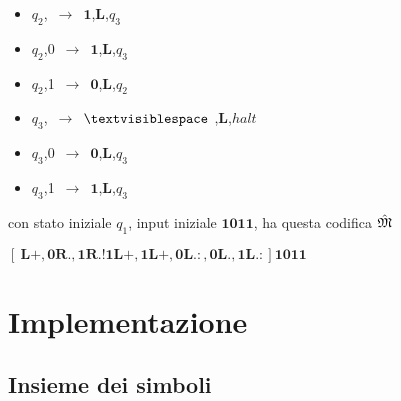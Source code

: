 \documentclass[a4paper]{article}
\theoremstyle{plain}
\theoremstyle{definition}
\begin{document}
	\vspace{1pt}
		\begin{itemize}
			\item  \begin{center}
			$q_2$,\textvisiblespace\ $\rightarrow$\ $\mathbf{1}$,$\mathbf{L}$,$q_3$
			\end{center}			
			\item \begin{center}
			$q_2$,0\ $\rightarrow$\ $\mathbf{1}$,$\mathbf{L}$,$q_3$
			\end{center}			
			\item \begin{center}
			$q_2$,1\ $\rightarrow$\ $\mathbf{0}$,$\mathbf{L}$,$q_2$
			\end{center}
		\end{itemize}	
	\vspace{3pt}

	\vspace{1pt}
		\begin{itemize}
			\item  \begin{center}
			$q_3$,\textvisiblespace\ $\rightarrow$\ $\mathbf{\textvisiblespace\ }$,$\mathbf{L}$,$halt$
			\end{center}			
			\item \begin{center}
			$q_3$,0\ $\rightarrow$\ $\mathbf{0}$,$\mathbf{L}$,$q_3$
			\end{center}			
			\item \begin{center}
			$q_3$,1\ $\rightarrow$\ $\mathbf{1}$,$\mathbf{L}$,$q_3$
			\end{center}
		\end{itemize}	
	\vspace{3pt}


con stato iniziale $q_1$, input iniziale $\mathbf{1011}$, ha questa codifica $\Hat{\mathfrak{M}}$

\vspace{3pt}
\begin{center}
$\mathbf{[\ L+,0R.,1R.!1L+,1L+,0L.:,0L.,1L.:]1011}$
\end{center}
\vspace{3pt}

\section{Implementazione}
\label{sec:Impl}


\subsection{Insieme dei simboli}
\label{sec:SymbolSet}
\end{document}
